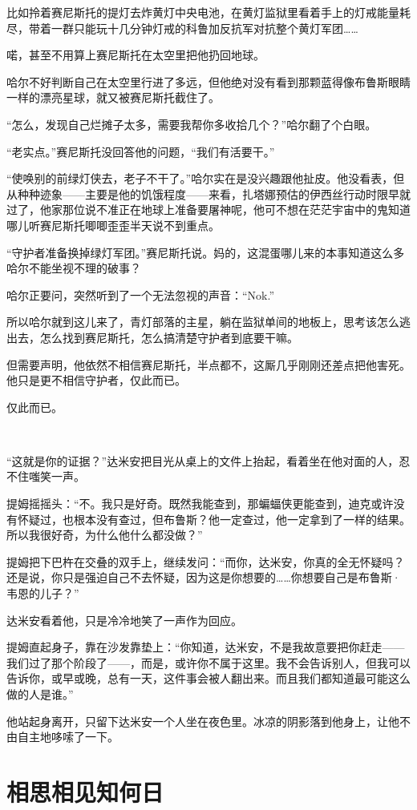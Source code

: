 \documentclass[../main]{subfiles}
\begin{document}
比如拎着赛尼斯托的提灯去炸黄灯中央电池，在黄灯监狱里看着手上的灯戒能量耗尽，带着一群只能玩十几分钟灯戒的科鲁加反抗军对抗整个黄灯军团……

喏，甚至不用算上赛尼斯托在太空里把他扔回地球。

哈尔不好判断自己在太空里行进了多远，但他绝对没有看到那颗蓝得像布鲁斯眼睛一样的漂亮星球，就又被赛尼斯托截住了。

“怎么，发现自己烂摊子太多，需要我帮你多收拾几个？”哈尔翻了个白眼。

“老实点。”赛尼斯托没回答他的问题，“我们有活要干。”

“使唤别的前绿灯侠去，老子不干了。”哈尔实在是没兴趣跟他扯皮。他没看表，但从种种迹象——主要是他的饥饿程度——来看，扎塔娜预估的伊西丝行动时限早就过了，他家那位说不准正在地球上准备要屠神呢，他可不想在茫茫宇宙中的鬼知道哪儿听赛尼斯托唧唧歪歪半天说不到重点。

“守护者准备换掉绿灯军团。”赛尼斯托说。妈的，这混蛋哪儿来的本事知道这么多哈尔不能坐视不理的破事？

哈尔正要问，突然听到了一个无法忽视的声音：“Nok.”

所以哈尔就到这儿来了，青灯部落的主星，躺在监狱单间的地板上，思考该怎么逃出去，怎么找到赛尼斯托，怎么搞清楚守护者到底要干嘛。

但需要声明，他依然不相信赛尼斯托，半点都不，这厮几乎刚刚还差点把他害死。他只是更不相信守护者，仅此而已。

仅此而已。

~\

“这就是你的证据？”达米安把目光从桌上的文件上抬起，看着坐在他对面的人，忍不住嗤笑一声。

提姆摇摇头：“不。我只是好奇。既然我能查到，那蝙蝠侠更能查到，迪克或许没有怀疑过，也根本没有查过，但布鲁斯？他一定查过，他一定拿到了一样的结果。所以我很好奇，为什么他什么都没做？”

提姆把下巴杵在交叠的双手上，继续发问：“而你，达米安，你真的全无怀疑吗？还是说，你只是强迫自己不去怀疑，因为这是你想要的……你想要自己是布鲁斯·韦恩的儿子？”

达米安看着他，只是冷冷地笑了一声作为回应。

提姆直起身子，靠在沙发靠垫上：“你知道，达米安，不是我故意要把你赶走——我们过了那个阶段了——，而是，或许你不属于这里。我不会告诉别人，但我可以告诉你，或早或晚，总有一天，这件事会被人翻出来。而且我们都知道最可能这么做的人是谁。”

他站起身离开，只留下达米安一个人坐在夜色里。冰凉的阴影落到他身上，让他不由自主地哆嗦了一下。

\section{相思相见知何日}
\end{document}
